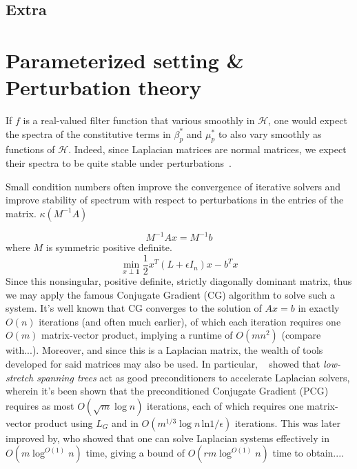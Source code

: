 \documentclass[12pt]{article}
\numberwithin{equation}{section}
\newcommand{\+}{%
	\raisebox{0.18ex}{\scaleobj{0.55}{+}}
}
\theoremstyle{definition}
\begin{document}
\subsection{Extra}
\section{Parameterized setting \& Perturbation theory}
If $f$ is a real-valued filter function that various smoothly in $\mathcal{H}$, one would expect the spectra of the constitutive terms in $\beta_p^\ast$ and $\mu_p^\ast$ to also vary smoothly as functions of $\mathcal{H}$.
Indeed, since Laplacian matrices are normal matrices, we expect their spectra to be quite stable under perturbations~\cite{}. 


Small condition numbers often improve the convergence of iterative solvers and improve stability of spectrum with respect to perturbations in the entries of the matrix. 
$\kappa(M^{-1} A)$

$$
M^{-1} A x = M^{-1}b 
$$
where $M$ is symmetric positive definite. 
\begin{equation}
	\min_{x \perp \mathbf{1} } \frac{1}{2} x^T (L + \epsilon I_n) x - b^T x
\end{equation}
Since this nonsingular, positive definite, strictly diagonally dominant matrix, thus we may apply the famous Conjugate Gradient (CG) algorithm to solve such a system. It's well known that CG converges to the solution of $A x = b$ in exactly $O(n)$ iterations (and often much earlier), of which each iteration requires one $O(m)$ matrix-vector product, implying a runtime of $O(mn^2)$ (compare with...).  
Moreover, and since this is a Laplacian matrix, the wealth of tools developed for said matrices may also be used.
In particular, ~\cite{} showed that \emph{low-stretch spanning trees} act as good preconditioners to accelerate Laplacian solvers, wherein it's been shown that the preconditioned Conjugate Gradient (PCG) requires as most $O(\sqrt{m} \log n)$ iterations, each of which requires one matrix-vector product using $L_G$ and in $O(m^{1/3} \log n \, \mathrm{ln} 1/\epsilon)$ iterations. 
This was later improved by, who showed that one can solve Laplacian systems effectively in $O(m \log^{O(1)} n)$ time, giving a bound of $O(r m \log^{O(1)} n)$ time to obtain.... 
\end{document}
